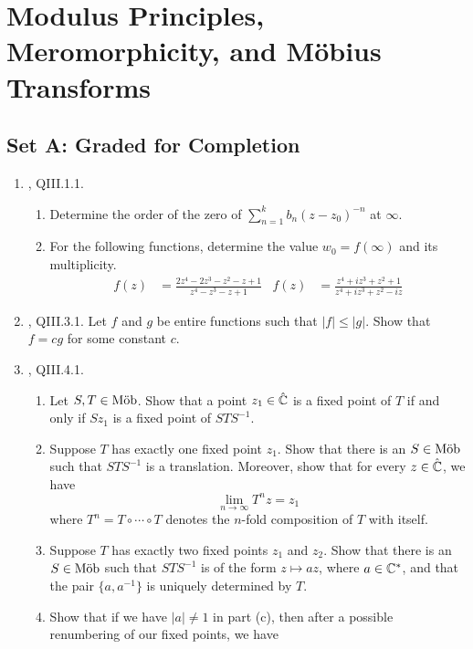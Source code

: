 \documentclass[../psets.tex]{subfiles}
\begin{document}
\section{Modulus Principles, Meromorphicity, and M\"{o}bius Transforms}
\subsection*{Set A: Graded for Completion}
\begin{enumerate}[ref={A.\arabic*}]
    \item {}\textcite{bib:FischerLieb}, QIII.1.1.
    \begin{enumerate}
        \item Determine the order of the zero of $\sum_{n=1}^kb_n(z-z_0)^{-n}$ at $\infty$.
        \item For the following functions, determine the value $w_0=f(\infty)$ and its multiplicity.
        \begin{align*}
            f(z) &= \frac{2z^4-2z^3-z^2-z+1}{z^4-z^3-z+1}&
            f(z) &= \frac{z^4+iz^3+z^2+1}{z^4+iz^3+z^2-iz}
        \end{align*}
    \end{enumerate}
    \item \textcite{bib:FischerLieb}, QIII.3.1. Let $f$ and $g$ be entire functions such that $|f|\leq|g|$. Show that $f=cg$ for some constant $c$.
    \item \textcite{bib:FischerLieb}, QIII.4.1.
    \begin{enumerate}
        \item Let $S,T\in\operatorname{M\ddot{o}b}$. Show that a point $z_1\in\hat{\mathbb{C}}$ is a fixed point of $T$ if and only if $Sz_1$ is a fixed point of $STS^{-1}$.
        \item Suppose $T$ has exactly one fixed point $z_1$. Show that there is an $S\in\operatorname{M\ddot{o}b}$ such that $STS^{-1}$ is a translation. Moreover, show that for every $z\in\hat{\mathbb{C}}$, we have
        \begin{equation*}
            \lim_{n\to\infty}T^nz = z_1
        \end{equation*}
        where $T^n=T\circ\cdots\circ T$ denotes the $n$-fold composition of $T$ with itself.
        \item Suppose $T$ has exactly two fixed points $z_1$ and $z_2$. Show that there is an $S\in\operatorname{M\ddot{o}b}$ such that $STS^{-1}$ is of the form $z\mapsto az$, where $a\in\mathbb{C}^*$, and that the pair $\{a,a^{-1}\}$ is uniquely determined by $T$.
        \item Show that if we have $|a|\neq 1$ in part (c), then after a possible renumbering of our fixed points, we have

\end{enumerate}
\end{enumerate}
\end{document}
